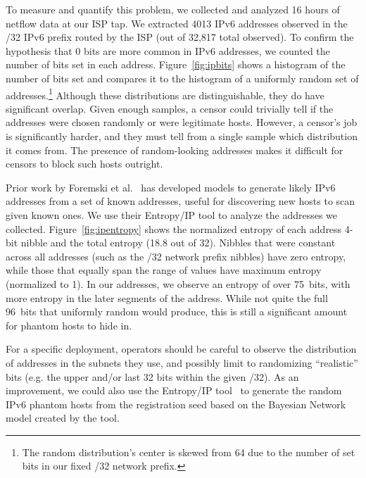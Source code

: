 \documentclass[sigconf]{acmart}
\begin{document}
To measure and quantify this problem, we collected and analyzed 16 hours of
netflow data at our ISP tap. We extracted 4013 IPv6 addresses observed in the /32
IPv6 prefix routed by the ISP (out of 32,817 total observed). To confirm the
hypothesis that 0 bits are more common in IPv6 addresses, we counted the number
of bits set in each address. Figure~\ref{fig:ipbits} shows a histogram of the
number of bits set and compares it to the histogram of a uniformly random set of
addresses.\footnote{The random distribution's center is skewed from 64 due to
the number of set bits in our fixed /32 network prefix.} Although these
distributions are distinguishable, they do have significant overlap. Given
enough samples, a censor could trivially tell if the addresses were chosen
randomly or were legitimate hosts. However, a censor's job is significantly
harder, and they must tell from a single sample which distribution it comes
from. The presence of random-looking addresses makes it difficult for censors to
block such hosts outright.


\FigIpEntropy

Prior work by Foremski et al.~\cite{foremski2016entropy} has developed models to
generate likely IPv6 addresses from a set of known addresses, useful for
discovering new hosts to scan given known ones. We use their Entropy/IP tool to
analyze the addresses we collected. Figure~\ref{fig:ipentropy} shows the
normalized entropy of each address 4-bit nibble and the total entropy (18.8 out
of 32). Nibbles that were constant across all addresses
(such as the /32 network prefix nibbles) have zero entropy, while those that
equally span the range of values have maximum entropy (normalized to 1). In our
addresses, we observe an entropy of over 75~bits, with more entropy in the later
segments of the address. While not quite the full 96~bits that uniformly random
would produce, this is still a significant amount for phantom hosts to hide in.

For a specific deployment, operators should be careful to observe the distribution of
addresses in the subnets they use, and possibly limit to randomizing ``realistic''
bits (e.g. the upper and/or last 32 bits within the given /32).
As an improvement, we could also use the Entropy/IP
tool~\cite{foremski2016entropy} to generate the random IPv6 phantom hosts from
the registration seed based on the Bayesian Network model created by the tool.
\end{document}
